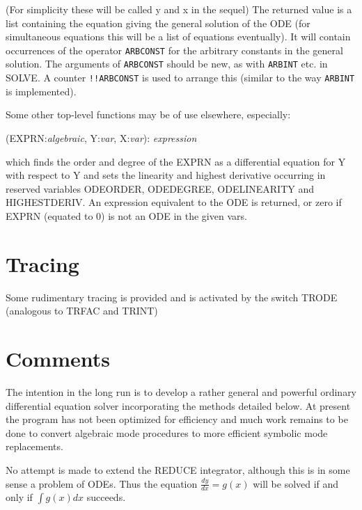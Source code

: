 \noindent (For simplicity these will be called y and x in the sequel)
The returned value is a list containing the equation giving the
general solution of the ODE (for simultaneous equations this will be a
list of equations eventually). It will contain occurrences of the
operator {\tt ARBCONST} for the arbitrary constants in the general solution.
The arguments of {\tt ARBCONST} should be new, as with {\tt ARBINT} etc.
in SOLVE. A counter {\tt !!ARBCONST} is used to arrange this (similar to the
way {\tt ARBINT} is implemented).

Some other top-level functions may be of use elsewhere, especially:

\vspace{.1in}
(EXPRN:{\em algebraic}, Y:{\em var}, X:{\em var}):
{\em expression}
\vspace{.1in}

\noindent which finds the order and degree of the EXPRN as a differential
equation for Y with respect to Y and sets the linearity and highest
derivative occurring in reserved variables ODEORDER, ODEDEGREE,
  
ODELINEARITY and HIGHESTDERIV. An expression equivalent to the ODE is
returned, or zero if EXPRN (equated to 0) is not an ODE in the
given vars.

\section{Tracing}

Some rudimentary tracing is provided and is activated by the switch TRODE
(analogous to TRFAC and TRINT)

\section{Comments}

The intention in the long run is to develop a rather general and
powerful ordinary differential equation solver incorporating the
methods detailed below.  At present the program has not been optimized
for efficiency and much work remains to be done to convert algebraic
mode procedures to more efficient symbolic mode replacements.

No attempt is made to extend the REDUCE integrator, although this is
in some sense a problem of ODEs.  Thus the equation $\frac{dy}{dx} = g(x)$ will
be solved if and only if $\int g(x) dx$ succeeds.

